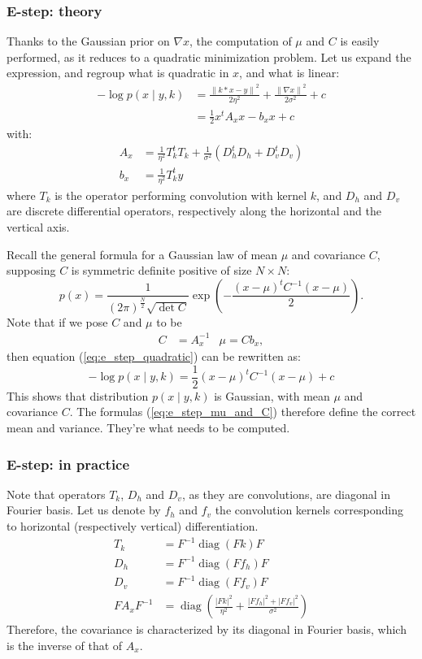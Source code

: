 \documentclass[english,a4paper]{article}
\theoremstyle{plain}
\theoremstyle{definition}
\theoremstyle{remark}
\DeclareMathOperator{\diag}{diag}
\newcommand{\norm}[1]{\left\lVert #1 \right\rVert}
\begin{document}
\subsubsection{E-step: theory}
Thanks to the Gaussian prior on $\nabla x$, the computation of $\mu$ and $C$ is easily performed, as it reduces to a quadratic minimization problem.
Let us expand the expression, and regroup what is quadratic in $x$, and what is linear:
\begin{align}\label{eq:e_step_quadratic}
-\log p(x \mid y,k) &= \frac{\norm{k*x-y}^2}{2\eta^2} + \frac{\norm{\nabla x}^2}{2\sigma^2} + c \nonumber
\\ 
&= \frac{1}{2}x^t A_x x - b_x x + c
\end{align}
with:
\begin{align*}
A_x &= \frac{1}{\eta^2} T_k^t T_k + \frac{1}{\sigma^2}(D_h^t D_h + D_v^t D_v)\\
b_x &= \frac{1}{\eta^2} T_k^t y
\end{align*}
where $T_k$ is the operator performing convolution with kernel $k$, and $D_h$ and $D_v$ are discrete differential operators, respectively along the horizontal and the vertical axis.

Recall the general formula for a Gaussian law of mean $\mu$ and covariance $C$, supposing $C$ is symmetric definite positive of size $N\times N$:
\begin{equation}\label{eq:general_gaussian}
p(x) = \frac{1}{(2\pi)^{\frac{N}{2}} \sqrt{\det C}} \exp \left( -\frac{(x-\mu)^t C^{-1} (x-\mu)}{2} \right) .
\end{equation}
Note that if we pose $C$ and $\mu$ to be
\begin{align}\label{eq:e_step_mu_and_C}
C &= A_x^{-1}
&
\mu = C b_x ,
\end{align}
then equation (\ref{eq:e_step_quadratic}) can be rewritten as:
\begin{equation}\label{eq:e_step_gaussian}
-\log p(x \mid y,k) = \frac{1}{2} (x-\mu)^t C^{-1} (x-\mu) + c
\end{equation}
This shows that distribution $p(x \mid y,k)$ is Gaussian, with mean $\mu$ and covariance $C$.
The formulas (\ref{eq:e_step_mu_and_C}) therefore define the correct mean and variance. They're what needs to be computed.


\subsubsection{E-step: in practice}
Note that operators $T_k$, $D_h$ and $D_v$, as they are convolutions, are diagonal in Fourier basis. Let us denote by $f_h$ and $f_v$ the convolution kernels corresponding to horizontal (respectively vertical) differentiation.
\begin{align}
T_k &= F^{-1} \diag(Fk) F\\
D_h &= F^{-1} \diag(Ff_h) F \nonumber \\
D_v &= F^{-1} \diag(Ff_v) F \nonumber \\
\label{eq:fourier_A_x}
F A_x F^{-1} &= \diag \left( \frac{|Fk|^2}{\eta^2} + \frac{|Ff_h|^2 + |Ff_v|^2}{\sigma^2} \right)
\end{align}
Therefore, the covariance is characterized by its diagonal in Fourier basis, which is the inverse of that of $A_x$. 
\end{document}

